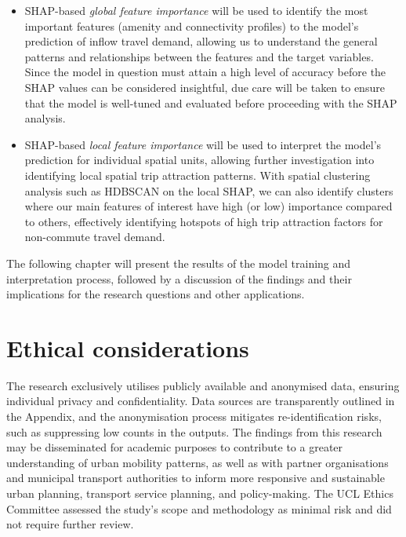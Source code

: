 \begin{itemize}
\setlength\itemsep{0em} 
    \item SHAP-based \textit{global feature importance} will be used to identify the most important features (amenity and connectivity profiles) to the model's prediction of inflow travel demand, allowing us to understand the general patterns and relationships between the features and the target variables. Since the model in question must attain a high level of accuracy before the SHAP values can be considered insightful, due care will be taken to ensure that the model is well-tuned and evaluated before proceeding with the SHAP analysis.
    \item SHAP-based \textit{local feature importance} will be used to interpret the model's prediction for individual spatial units, allowing further investigation into identifying local spatial trip attraction patterns. With spatial clustering analysis such as HDBSCAN on the local SHAP, we can also identify clusters where our main features of interest have high (or low) importance compared to others, effectively identifying hotspots of high trip attraction factors for non-commute travel demand.
\end{itemize}

The following chapter will present the results of the model training and interpretation process, followed by a discussion of the findings and their implications for the research questions and other applications.

\section{Ethical considerations}

The research exclusively utilises publicly available and anonymised data, ensuring individual privacy and confidentiality. Data sources are transparently outlined in the Appendix, and the anonymisation process mitigates re-identification risks, such as suppressing low counts in the outputs. The findings from this research may be disseminated for academic purposes to contribute to a greater understanding of urban mobility patterns, as well as with partner organisations and municipal transport authorities to inform more responsive and sustainable urban planning, transport service planning, and policy-making. The UCL Ethics Committee assessed the study's scope and methodology as minimal risk and did not require further review.
